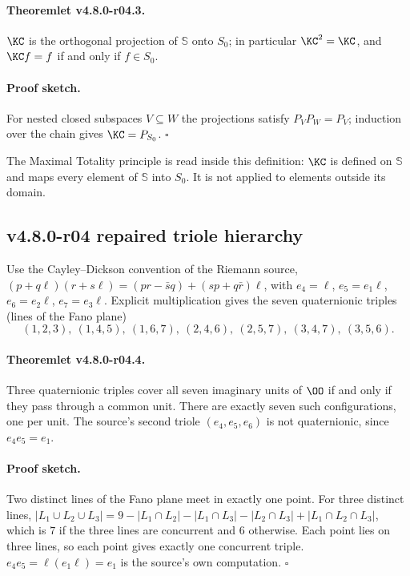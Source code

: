 \paragraph{Theoremlet v4.8.0-r04.3.}
\(\KC\) is the orthogonal projection of \(\mathbb S\) onto \(S_0\); in particular
\(\KC^2=\KC\), and \(\KC f=f\) if and only if \(f\in S_0\).

\paragraph{Proof sketch.}
For nested closed subspaces \(V\subseteq W\) the projections satisfy \(P_VP_W=P_V\); induction
over the chain gives \(\KC=P_{S_0}\).  \(\square\)

The Maximal Totality principle is read inside this definition: \(\KC\) is defined on
\(\mathbb S\) and maps every element of \(\mathbb S\) into \(S_0\).  It is not applied to
elements outside its domain.

\subsection*{v4.8.0-r04 repaired triole hierarchy}
\label{subsec:v480-r04-triole-hierarchy}

Use the Cayley--Dickson convention of the Riemann source,
\((p+q\ell)(r+s\ell)=(pr-\bar sq)+(sp+q\bar r)\ell\), with \(e_4=\ell\), \(e_5=e_1\ell\),
\(e_6=e_2\ell\), \(e_7=e_3\ell\).  Explicit multiplication gives the seven quaternionic triples
(lines of the Fano plane)
\[
(1,2,3),\ (1,4,5),\ (1,6,7),\ (2,4,6),\ (2,5,7),\ (3,4,7),\ (3,5,6).
\]

\paragraph{Theoremlet v4.8.0-r04.4.}
Three quaternionic triples cover all seven imaginary units of \(\OO\) if and only if they pass
through a common unit.  There are exactly seven such configurations, one per unit.  The source's
second triole \((e_4,e_5,e_6)\) is not quaternionic, since \(e_4e_5=e_1\).

\paragraph{Proof sketch.}
Two distinct lines of the Fano plane meet in exactly one point.  For three distinct lines,
\(|L_1\cup L_2\cup L_3|=9-|L_1\cap L_2|-|L_1\cap L_3|-|L_2\cap L_3|+|L_1\cap L_2\cap L_3|\),
which is \(7\) if the three lines are concurrent and \(6\) otherwise.  Each point lies on three
lines, so each point gives exactly one concurrent triple.  \(e_4e_5=\ell(e_1\ell)=e_1\) is the
source's own computation.  \(\square\)

